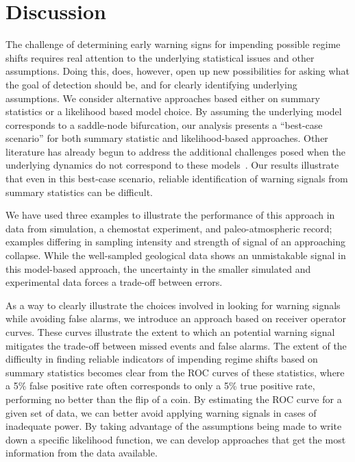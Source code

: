 \documentclass[authoryear,review,11pt]{elsarticle}
\begin{document}
\section{Discussion}

The challenge of determining early warning signs for impending possible regime shifts 
requires real attention to the underlying statistical issues and other assumptions.  
Doing this, does, however, open up new possibilities for asking what the goal of detection should be, 
and for clearly identifying underlying assumptions. 
We consider alternative approaches based either on summary statistics or a likelihood based model choice.  
By assuming the underlying model corresponds to a saddle-node bifurcation,
our analysis presents a ``best-case scenario'' for both  summary statistic and  likelihood-based approaches.
Other literature has already begun to address the additional challenges posed when the underlying
dynamics do not correspond to these models~\citep{Hastings2010}.
Our results illustrate that even in this best-case scenario,
reliable identification of warning signals from summary statistics can be difficult.

We have used three examples to illustrate the performance of this approach in data from 
simulation, a chemostat experiment, and paleo-atmospheric record; examples differing in 
sampling intensity and strength of signal of an approaching collapse.  
While the well-sampled geological data shows an unmistakable signal in this model-based approach,
the uncertainty in the smaller simulated and experimental data forces a trade-off between errors.  
 
As a way to clearly illustrate the choices involved in looking for warning signals while avoiding false alarms,
we introduce an approach based on receiver operator curves. 
These curves illustrate the extent to which an potential warning signal mitigates the trade-off 
between missed events and false alarms.  
The extent of the difficulty in finding reliable indicators of impending regime shifts
based on summary statistics becomes clear from the ROC curves of these statistics,
where a 5\% false positive rate often corresponds to only a 5\% true positive rate,
performing no better than the flip of a coin. 
By estimating the ROC curve for a given set of data,
we can better avoid applying warning signals in cases of inadequate power.
By taking advantage of the assumptions being made to write down a specific likelihood function,
we can develop approaches that get the most information from the data available.
\end{document}
